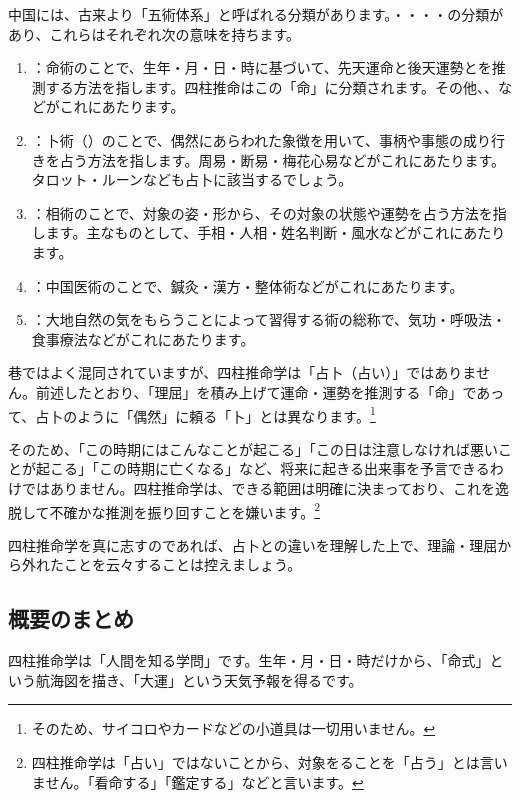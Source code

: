 \documentclass[a4paper,11pt,twocolumn,dvipdfmx]{tarticle}
\begin{document}
中国には、古来より「五術体系」と呼ばれる分類があります。・・・・の分類があり、これらはそれぞれ次の意味を持ちます。
\begin{enumerate}
\item {}：命術のことで、生年・月・日・時に基づいて、先天運命と後天運勢とを推測する方法を指します。四柱推命はこの「命」に分類されます。その他、、などがこれにあたります。
\item {}：卜術（）のことで、偶然にあらわれた象徴を用いて、事柄や事態の成り行きを占う方法を指します。周易・断易・梅花心易などがこれにあたります。タロット・ルーンなども占卜に該当するでしょう。
\item {}：相術のことで、対象の姿・形から、その対象の状態や運勢を占う方法を指します。主なものとして、手相・人相・姓名判断・風水などがこれにあたります。
\item {}：中国医術のことで、鍼灸・漢方・整体術などがこれにあたります。
\item {}：大地自然の気をもらうことによって習得する術の総称で、気功・呼吸法・食事療法などがこれにあたります。
\end{enumerate}
巷ではよく混同されていますが、四柱推命学は「占卜（占い）」ではありません。前述したとおり、「理屈」を積み上げて運命・運勢を推測する「命」であって、占卜のように「偶然」に頼る「卜」とは異なります。\footnote{そのため、サイコロやカードなどの小道具は一切用いません。}

そのため、「この時期にはこんなことが起こる」「この日は注意しなければ悪いことが起こる」「この時期に亡くなる」など、将来に起きる出来事を予言できるわけではありません。四柱推命学は、できる範囲は明確に決まっており、これを逸脱して不確かな推測を振り回すことを嫌います。\footnote{四柱推命学は「占い」ではないことから、対象をることを「占う」とは言いません。「看命する」「鑑定する」などと言います。}

四柱推命学を真に志すのであれば、占卜との違いを理解した上で、理論・理屈から外れたことを云々することは控えましょう。

\subsection{概要のまとめ}
四柱推命学は「人間を知る学問」です。生年・月・日・時だけから、「命式」という航海図を描き、「大運」という天気予報を得るです。
\end{document}

